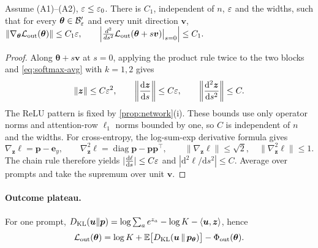 \begin{lemma}
\label{lem:end-smooth}
Assume (A1)--(A2), $\varepsilon\le\varepsilon_0$. There is $C_1$, independent of $n$, $\varepsilon$ and the widths, such that for every $\bm\theta\in\mathcal B_{\varepsilon}'$ and
every unit direction $\bm v$,
 $\|\nabla_{\bm\theta}\mathcal L_{\mathrm{out}}(\bm\theta)\|\le C_1\varepsilon,\qquad \Bigl|\frac{d^2}{ds^2}\mathcal L_{\mathrm{out}}(\bm\theta+s\bm v)\big|_{s=0}\Bigr|\le C_1 .$ 
\end{lemma}

\begin{proof}
Along $\bm\theta+s\bm v$ at $s=0$, applying the product rule twice to the
two blocks and \cref{eq:softmax-avg} with $k=1,2$ gives
\[
 \|\bm z\|\le C\initscale^2,\qquad
 \left\|\dd{\bm z}{s}\right\|\le C\initscale,\qquad
 \left\|\frac{\mathrm d^2\bm z}{\mathrm d s^2}\right\|\le C.
\]
The ReLU pattern is fixed by \cref{prop:network}(i). These bounds use only
operator norms and attention-row $\ell_1$ norms bounded by one, so $C$ is
independent of $n$ and the widths.
For cross-entropy, the log-sum-exp derivative formula
\citep[Section~3.1.5]{boyd2004convex} gives
\[
 \nabla_{\bm z}\ell=\bm p-\bm e_y,\qquad
 \nabla_{\bm z}^2\ell=\operatorname{diag}\bm p-\bm p\bm p^\top,
 \qquad \|\nabla_{\bm z}\ell\|\le\sqrt2,\quad
 \|\nabla_{\bm z}^2\ell\|\le1.
\]
The chain rule therefore yields
$|\dd{\ell}{s}|\le C\initscale$ and
$|\mathrm d^2\ell/\mathrm d s^2|\le C$.
Average over prompts and take the supremum over unit $\bm v$.
\end{proof}

\paragraph{Outcome plateau.}\label{app:end} For one prompt, $D_{\mathrm{KL}}(\bm u\|\bm p)=\log\sum_ae^{z_a}-\log K-\langle\bm u,\bm z\rangle$, hence
\begin{equation}
 \mathcal L_{\mathrm{out}}(\bm\theta)=\log K+\mathbb E\bigl[D_{\mathrm{KL}}(\bm u\,\|\,\bm p_{\bm\theta})\bigr]-\Phi_{\mathrm{out}}(\bm\theta).
 \label{eq:lo-identity}
\end{equation}

